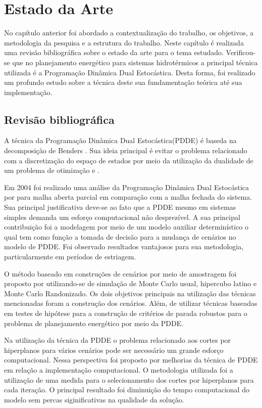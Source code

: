 \chapter{Estado da Arte}
No cap\'itulo anterior foi abordado a contextualiza\c c\~ao do trabalho, os objetivos, a metodologia da pesquisa e a
estrutura do trabalho. Neste cap\'itulo \'e realizada uma revis\~ao bibliogr\'afica sobre o estado da arte para o tema
estudado.
Verificou-se que no planejamento energ\'etico para sistemas hidrot\'ermicos a principal t\'ecnica utilizada \'e a
Programa\c c\~ao Din\^amica Dual Estoc\'astica. Desta forma, foi realizado um profundo estudo sobre a t\'ecnica deste sua
fundamenta\c c\~ao te\'orica at\'e sua implementa\c c\~ao.
\section{Revis\~ao bibliogr\'afica}
A t\'ecnica da Programa\c c\~ao Din\^amica Dual Estoc\'astica(PDDE) \'e baseda na decomposi\c c\~ao de Benders \cite{benders}.
Sua ideia principal \'e evitar o problema relacionado com a discretiza\c c\~ao do espa\c co de estados por meio da utiliza\c c\~ao da
dualidade de um problema de otimiza\c c\~ao \cite{alexey} e \cite{boyd}.

Em 2004 foi realizado uma an\'alise da Programa\c c\~ao  Din\^amica Dual Estoc\'astica por \cite{soares} para malha
aberta parcial em compara\c c\~ao com a malha fechada do sistema. Sua principal justificativa deve-se ao fato que a PDDE
mesmo em sistemas simples demanda um esfor\c co computacional n\~ao desprez\'ivel. A sua principal contribui\c c\~ao
foi a
modelagem por meio de um modelo auxiliar determin\'istico o qual tem como fun\c c\~ao a tomada de decis\~ao para a
mudan\c ca de cen\'arios no modelo de PDDE. Foi observado resultados vantajosos para sua metodologia, particularmente em
per\'iodos de estriagem.

O m\'etodo baseado em constru\c c\~oes de cen\'arios por meio de amostragem foi proposto por \cite{homem} utilizando-se
de simula\c c\~ao de Monte Carlo usual, hipercubo latino e Monte Carlo Randonizado. Os dois objetivos principais na
utiliza\c c\~ao das t\'ecnicas mencionadas foram a constru\c c\~ao dos cen\'arios. Al\'em, de utilizar t\'ecnicas
baseadas em testes de hip\'otese para a constru\c c\~ao de crit\'erios de parada robustos para o problema de
planejamento energ\'etico por meio da PDDE. 

Na utiliza\c c\~ao da t\'ecnica da PDDE o problema relacionado aos cortes por hiperplanos para v\'arios cen\'arios
pode ser necess\'ario um grande esfor\c co computacional. Nessa perspectiva foi proposto por \cite{dematos} melhorias da
t\'ecnica de PDDE em rela\c c\~ao a implementa\c c\~ao computacional. O metodologia utilizada foi a
utiliza\c c\~ao de uma medida para o selecionamento dos cortes por hiperplanos para cada itera\c c\~ao. O principal
resultado foi diminui\c c\~ao do tempo computacional do modelo sem percas siginificativas na qualidade da solu\c c\~ao. 

